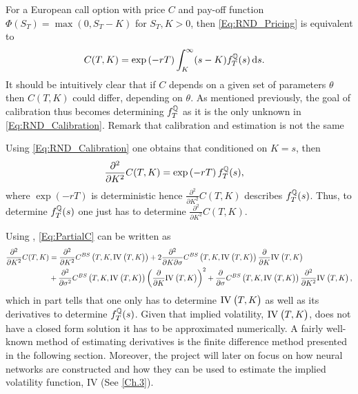 For a European call option with price $C$ and pay-off function $\Phi(S_T)=\max(0, S_T-K)$ for $S_T, K>0$, then \eqref{Eq:RND_Pricing} is equivalent to
\begin{align}\label{Eq:RND_Calibration}
    C(T,K) &= \exp\left(-rT\right)\int_K^\infty (s-K)f_T^{\mathbb{Q}}(s)\,\mathrm{d}s.
\end{align}
It should be intuitively clear that if $C$ depends on a given set of parameters $\theta$ then $C(T,K)$ could differ, depending on $\theta$. As mentioned previously, the goal of calibration thus becomes determining $f_T^{\mathbb{Q}}$ as it is the only unknown in \eqref{Eq:RND_Calibration}. Remark that calibration and estimation is not the same

Using \eqref{Eq:RND_Calibration} one obtains that conditioned on $K=s$, then
\begin{align}\label{Eq:PartialC}
    \frac{\partial^2}{\partial K^2}C(T,K) &= \exp\left(-rT\right)f_T^{\mathbb{Q}}(s),
\end{align}
where $\exp\left(-rT\right)$ is deterministic hence $\frac{\partial^2}{\partial K^2}C(T,K)$ describes $f_T^{\mathbb{Q}}(s)$. Thus, to determine $f_T^{\mathbb{Q}}(s)$ one just has to determine $\frac{\partial^2}{\partial K^2}C(T,K)$.

Using \citep{1458}, \eqref{Eq:PartialC} can be written as
\begin{align}\begin{aligned}\label{Eq:RND_Derivatives}
    \frac{\partial^2}{\partial K^2}C(T,K) &= \frac{\partial^2}{\partial K^2}C^{BS}\left(T,K,\IV{T,K}\right)+2\frac{\partial^2}{\partial K\partial\sigma}C^{BS}\left(T,K,\IV{T,K}\right)\frac{\partial}{\partial K}\IV{T,K}\\
    &+\frac{\partial^2}{\partial\sigma^2}C^{BS}\left(T,K,\IV{T,K}\right)\left(\frac{\partial}{\partial K}\IV{T,K}\right)^2+\frac{\partial}{\partial\sigma}C^{BS}\left(T,K,\IV{T,K}\right)\frac{\partial^2}{\partial K^2}\IV{T,K},
\end{aligned}\end{align}
which in part tells that one only has to determine $\IV{T,K}$ as well as its derivatives to determine $f_T^{\mathbb{Q}}(s)$. Given that implied volatility, $\IV{T,K}$, does not have a closed form solution it has to be approximated numerically. A fairly well-known method of estimating derivatives is the finite difference method presented in the following section. Moreover, the project will later on focus on how neural networks are constructed and how they can be used to estimate the implied volatility function, $\mathrm{IV}$ (See \autoref{Ch.3}).


